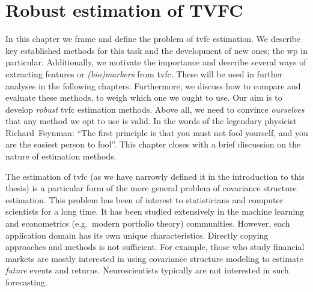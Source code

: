 \chapter{Robust estimation of TVFC}\label{ch:methods}

In this chapter we frame and define the problem of \gls{tvfc} estimation.
We describe key established methods for this task and the development of new ones; the \gls{wp} in particular.
Additionally, we motivate the importance and describe several ways of extracting features or \emph{(bio)markers} from \gls{tvfc}.
These will be used in further analyses in the following chapters.
%
Furthermore, we discuss how to compare and evaluate these methods, to weigh which one we ought to use.
Our aim is to develop \emph{robust} \gls{tvfc} estimation methods.
Above all, we need to convince \emph{ourselves} that any method we opt to use is valid.
In the words of the legendary physicist Richard~Feynman: ``The first principle is that you must not fool yourself, and you are the easiest person to fool''.
%
This chapter closes with a brief discussion on the nature of estimation methods.

The estimation of \gls{tvfc} (as we have narrowly defined it in the introduction to this thesis) is a particular form of the more general problem of covariance structure estimation.
This problem has been of interest to statisticians and computer scientists for a long time.
It has been studied extensively in the machine learning and econometrics (e.g.~modern portfolio theory) communities.
%
However, each application domain has its own unique characteristics.
Directly copying approaches and methods is not sufficient.
For example, those who study financial markets are mostly interested in using covariance structure modeling to estimate \emph{future} events and returns.
Neuroscientists typically are not interested in such forecasting.

